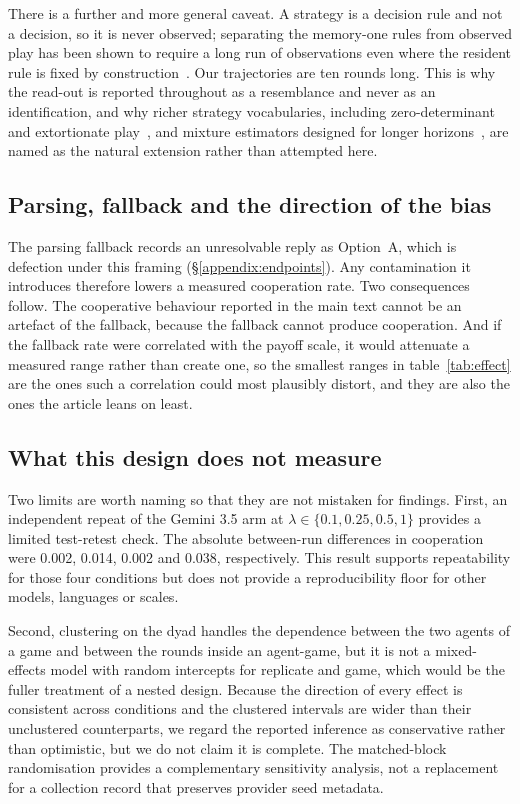 \documentclass[openacc]{rsproca_new}
\newcommand{\lam}{\lambda}
\begin{document}
There is a further and more general caveat. A strategy is a decision rule and
not a decision, so it is never observed; separating the memory-one rules from
observed play has been shown to require a long run of observations even where
the resident rule is fixed by construction~\cite{kim2021win,hilbe2013memory}.
Our trajectories are ten rounds long. This is why the read-out is reported
throughout as a resemblance and never as an identification, and why richer
strategy vocabularies, including zero-determinant and extortionate
play~\cite{pressDyson2012}, and mixture estimators designed for longer
horizons~\cite{fontana2025nicer,inferenceStrategies}, are named as the natural
extension rather than attempted here.

\subsection{Parsing, fallback and the direction of the bias}\label{appendix:robust_parsing}

The parsing fallback records an unresolvable reply as Option~A, which is
defection under this framing (\S\ref{appendix:endpoints}). Any contamination it
introduces therefore lowers a measured cooperation rate. Two consequences
follow. The cooperative behaviour reported in the main text cannot be an
artefact of the fallback, because the fallback cannot produce cooperation. And
if the fallback rate were correlated with the payoff scale, it would attenuate
a measured range rather than create one, so the smallest ranges in
table~\ref{tab:effect} are the ones such a correlation could most plausibly
distort, and they are also the ones the article leans on least.

\subsection{What this design does not measure}\label{appendix:robust_gaps}

Two limits are worth naming so that they are not mistaken for findings.
First, an independent repeat of the Gemini 3.5 arm at $\lam \in
\{0.1,0.25,0.5,1\}$ provides a limited test-retest check. The absolute
between-run differences in cooperation were 0.002, 0.014, 0.002 and 0.038,
respectively. This result supports repeatability for those four conditions but
does not provide a reproducibility floor for other models, languages or scales.

Second, clustering on the dyad handles the dependence between the two agents of
a game and between the rounds inside an agent-game, but it is not a
mixed-effects model with random intercepts for replicate and game, which would
be the fuller treatment of a nested design. Because the direction of every
effect is consistent across conditions and the clustered intervals are wider
than their unclustered counterparts, we regard the reported inference as
conservative rather than optimistic, but we do not claim it is complete.
The matched-block randomisation provides a complementary sensitivity analysis,
not a replacement for a collection record that preserves provider seed metadata.
\end{document}
